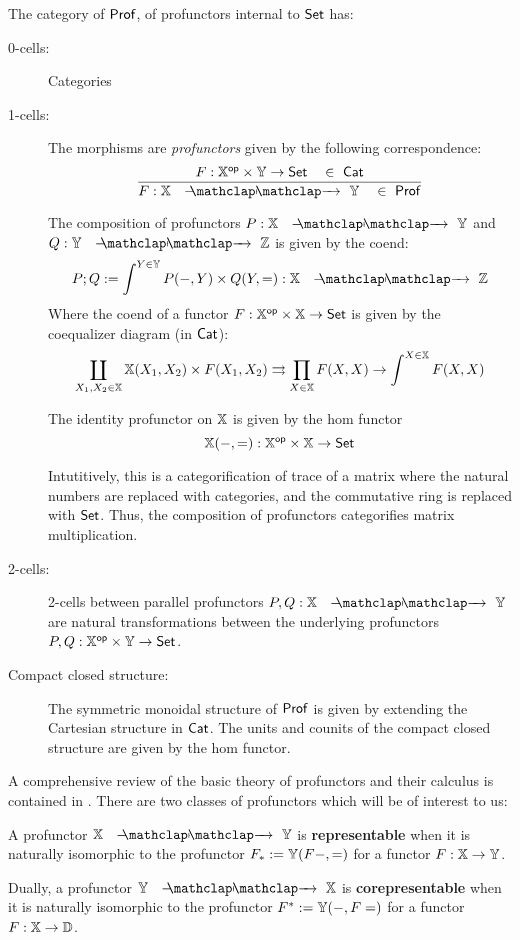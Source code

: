 \begin{definition}
The category of ${\sf Prof}$, of profunctors internal to $\mathsf{Set}$ has:
\begin{description}
\item[0-cells:] Categories
\item[1-cells:]  The morphisms are {\em profunctors} given by the following correspondence:
$$
\dfrac
{F:\X^\op\times\Y\to\Sets \quad \in\ \Cat}
{F:\X\proarrow \Y\quad \in\ \Prof}
$$

The composition of profunctors $P:\X\proarrow \Y$ and $Q:\Y\proarrow \Z$ is given by the coend:
$$
P;Q := \int^{Y \in \Y } P(-,Y) \times Q(Y,=):\X \proarrow \Z
$$
Where the coend of a functor $F:\mathbb{X}^{\mathsf{op}}\times\mathbb{X}\to \mathsf{Set}$ is given by the coequalizer diagram (in ${\sf Cat}$):
$$
\coprod_{X_1,X_2 \in \mathbb{X}} {\mathbb{X}}(X_1,X_2) \times F(X_1,X_2) \rightrightarrows \prod_{X \in \mathbb{X}} F(X,X) \to \int^{X \in \mathbb{X}} F(X,X)
$$


The identity profunctor on $\mathbb{X}$ is given by the hom functor
$$\mathbb{X}(-,=): \mathbb{X}^{\mathsf{op}}\times\mathbb{X}\to\mathsf{Set}$$


Intutitively, this is a categorification of trace of a matrix where the natural numbers are replaced with categories, and the commutative ring is replaced with $\mathsf{Set}$.  Thus, the composition of profunctors categorifies matrix multiplication.


\item[2-cells:]  2-cells between parallel profunctors $P,Q:\X\proarrow \Y$ are natural transformations between the underlying profunctors $P,Q:\mathbb{X}^{\mathsf{op}}\times \mathbb{Y} \to \mathsf{Set}$.

\item[Compact closed structure:] The symmetric monoidal structure of ${\sf Prof}$ is given by extending the Cartesian structure in ${\sf Cat}$.   The units and counits of the compact closed structure are given by the hom functor.

\end{description}
\end{definition}


A comprehensive review of the basic theory of profunctors and their calculus is contained in \cite{fosco}.
There are two classes of profunctors which will be of interest to us:

\begin{definition}


A profunctor $\X\proarrow \Y$ is {\bf representable} when it is naturally isomorphic to the profunctor $F_*:=\mathbb{Y}(F-,=)$ for a functor $F: \mathbb{X}\to \mathbb{Y}$.


Dually, a profunctor $\Y\proarrow \X$ is {\bf corepresentable} when it is naturally isomorphic to the profunctor $F^*:=\mathbb{Y}(-,F=)$ for a functor $F: \mathbb{X}\to \mathbb{D}$.


\end{definition}

